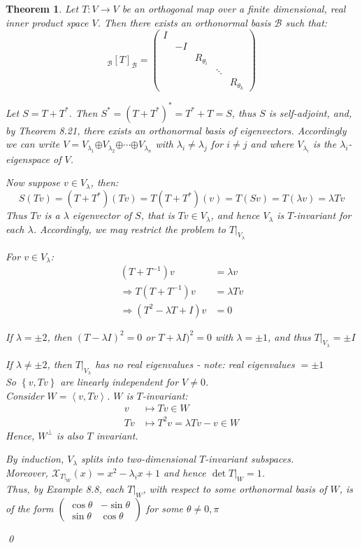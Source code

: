 \documentclass[11pt, a4paper]{report}
\makeatletter
\numberwithin{equation}{section}
\renewcommand{\chi}{\mathcal{X}}
\newcommand{\opl}{\boldsymbol{\oplus}}
\newcommand{\B}{\mathcal{B}}
\newcommand{\spn}[1]{\left\langle #1 \right\rangle}
\newcommand{\sett}[1]{\left\lbrace #1 \right\rbrace}
\newcommand{\pmx}[1]{\begin{pmatrix}#1\end{pmatrix}}
\numberwithin{equation}{subsection}
\theoremstyle{plain}
\newtheorem{thm}{Theorem}[chapter] %
\theoremstyle{definition}
\theoremstyle{remark}
\newtheorem*{prf}{Proof}
\renewenvironment{prf}[1][\proofname]{\par
  \vspace{-\topsep}%
  \normalfont
  \topsep0pt \partopsep0pt %
  \trivlist
  \item[\hskip\labelsep
        \itshape
    #1\@addpunct{.}]\ignorespaces
}{%
  \popQED\endtrivlist\@endpefalse
  \addvspace{6pt plus 6pt} %
}
\newcommand{\pr}[1]{\begin{adjustwidth}{1cm}{} \begin{prf} #1 \end{prf} \end{adjustwidth}}
\makeatother
\begin{document}
\begin{thm}
Let $T: V \to V$ be an orthogonal map over a finite dimensional, real inner product space $V$. Then there exists an orthonormal basis $\B$ such that:
$$_\B[T]_\B = \pmx{I\\&-I\\&&R_{\theta_i}\\&&&\ddots\\&&&&R_{\theta_k}}$$
\pr{
Let $S = T + T^*$. Then $S^* = (T + T^*)^* = T^* + T = S$, thus $S$ is self-adjoint, and, by Theorem 8.21, there exists an orthonormal basis of eigenvectors. Accordingly we can write $V = V_{\lambda_1} \opl V_{\lambda_2} \opl \cdots \opl V_{\lambda_n}$ with $\lambda_i \neq \lambda_j$ for $i \neq j$ and where $V_{\lambda_i}$ is the $\lambda_i$-eigenspace of $V$.

Now suppose $v \in V_\lambda$, then:
$$S(Tv) = (T + T^*)(Tv) = T(T + T^*)(v) = T(Sv) = T(\lambda v) = \lambda Tv$$
Thus $Tv$ is a $\lambda$ eigenvector of $S$, that is $Tv \in V_\lambda$, and hence $V_\lambda$ is $T$-invariant for each $\lambda$. Accordingly, we may restrict the problem to $T|_{V_\lambda}$

For $v \in V_\lambda$:
\begin{align*}
(T + T^{-1})v	&= \lambda v\\
\Rightarrow T(T + T^{-1})v &= \lambda Tv\\
\Rightarrow (T^2 - \lambda T + I)v &= 0
\end{align*}

If $\lambda = \pm 2$, then $(T-\lambda I)^2 = 0$ or $T+ \lambda I)^2 = 0$ with $\lambda = \pm 1$, and thus $T|_{V_\lambda} = \pm I$

If $\lambda \neq \pm 2$, then $T|_{V_\lambda}$ has no real eigenvalues - note: real eigenvalues $= \pm 1$\\
So $\sett{v, Tv}$ are linearly independent for $V \neq 0$.\\ Consider $W = \spn{v, Tv}$. $W$ is $T$-invariant:
\begin{align*}
v &\mapsto Tv \in W\\
Tv &\mapsto T^2v = \lambda Tv - v \in W
\end{align*}
Hence, $W^\perp$ is also $T$ invariant. 

By induction, $V_\lambda$ splits into two-dimensional $T$-invariant subspaces.\\ Moreover, $\chi_{T|_W} (x) = x^2 - \lambda_i x + 1$ and hence $\det T|_W = 1$.\\ Thus, by Example 8.8, each $T|_W$, with respect to some orthonormal basis of $W$, is of the form $\pmx{\cos\theta & -\sin\theta \\ \sin\theta & \cos\theta}$ for some $\theta \neq 0, \pi$
}\qed
\end{thm}
\end{document}

